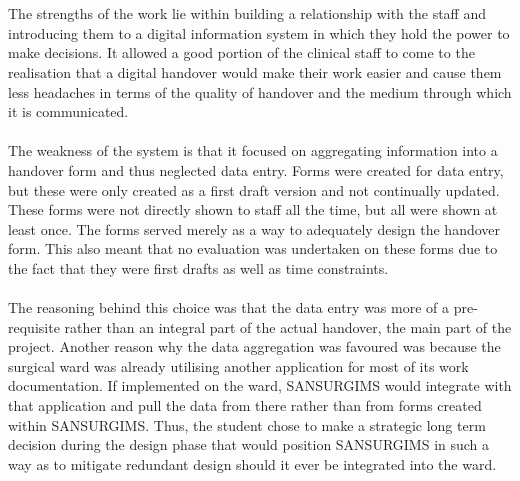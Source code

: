 \\ \\ 
The strengths of the work lie within building a relationship with the staff and introducing them to a digital information system in which they hold the power to make decisions. It allowed a good portion of the clinical staff to come to the realisation that a digital handover would make their work easier and cause them less headaches in terms of the quality of handover and the medium through which it is communicated. 
\\ \\
The weakness of the system is that it focused on aggregating information into a handover form and thus neglected data entry. Forms were created for data entry, but these were only created as a first draft version and not continually updated. These forms were not directly shown to staff all the time, but all were shown at least once. The forms served merely as a way to adequately design the handover form. This also meant that no evaluation was undertaken on these forms due to the fact that they were first drafts as well as time constraints. 
\\ \\
The reasoning behind this choice was that the data entry was more of a pre-requisite rather than an integral part of the actual handover, the main part of the project. Another reason why the data aggregation was favoured was because the surgical ward was already utilising another application for most of its work documentation. If implemented on the ward, SANSURGIMS would integrate with that application and pull the data from there rather than from forms created within SANSURGIMS. Thus, the student chose to make a strategic long term decision during the design phase that would position SANSURGIMS in such a way as to mitigate redundant design should it ever be integrated into the ward.

